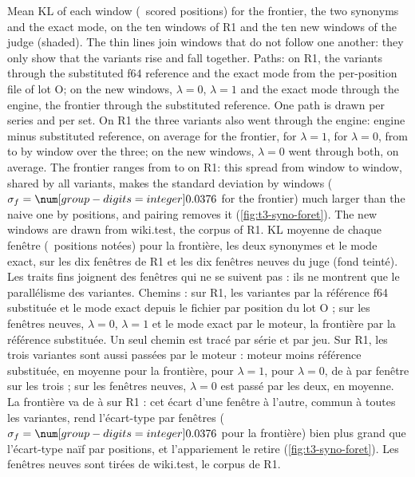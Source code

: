   {Mean KL of each window (\JconsNNotees\ scored positions) for the frontier, the two synonyms and the exact mode,
   on the ten windows of R1 and the ten new windows of the judge (shaded). The thin lines join windows that do not
   follow one another: they only show that the variants rise and fall together. Paths: on R1, the variants
   through the substituted f64 reference and the exact mode from the per-position file of lot O; on the new
   windows, $\lambda=0$, $\lambda=1$ and the exact mode through the engine, the frontier through the substituted
   reference. One path is drawn per series and per set. On R1 the three variants also went through the engine:
   engine minus substituted reference, \CodonNum{\JconsNCheminRunMoy} on average for the frontier,
   \CodonNum{+\JconsNCheminRunMoyUn} for $\lambda=1$, \CodonNum{\JconsNCheminRunMoyZero} for $\lambda=0$, from
   \CodonNum{\JconsNCheminRunMin} to \CodonNum{+\JconsNCheminRunMax} by window over the three; on the new windows,
   $\lambda=0$ went through both, \CodonNum{\JconsNCheminNeufMoy} on average. The
   frontier ranges from \CodonNum{\JconsNFrontMin} to \CodonNum{\JconsNFrontMax} on R1: this spread from window to
   window, shared by all variants, makes the standard deviation by windows ($\sigma_f=\CodonNum{\JconsNSigmaF}$ for
   the frontier) much larger than the naive one by positions, and pairing removes it (\cref{fig:t3-syno-foret}).
   The new windows are drawn from wiki.test, the corpus of R1.}
  {KL moyenne de chaque fenêtre (\JconsNNotees\ positions notées) pour la frontière, les deux synonymes et le mode
   exact, sur les dix fenêtres de R1 et les dix fenêtres neuves du juge (fond teinté). Les traits fins joignent des
   fenêtres qui ne se suivent pas : ils ne montrent que le parallélisme des variantes. Chemins : sur R1, les
   variantes par la référence f64 substituée et le mode exact depuis le fichier par position du lot O ; sur les
   fenêtres neuves, $\lambda=0$, $\lambda=1$ et le mode exact par le moteur, la frontière par la référence
   substituée. Un seul chemin est tracé par série et par jeu. Sur R1, les trois variantes sont aussi passées par
   le moteur : moteur moins référence substituée, \CodonNum{\JconsNCheminRunMoy} en moyenne pour la frontière,
   \CodonNum{+\JconsNCheminRunMoyUn} pour $\lambda=1$, \CodonNum{\JconsNCheminRunMoyZero} pour $\lambda=0$, de
   \CodonNum{\JconsNCheminRunMin} à \CodonNum{+\JconsNCheminRunMax} par fenêtre sur les trois ; sur les fenêtres
   neuves, $\lambda=0$ est passé par les deux, \CodonNum{\JconsNCheminNeufMoy} en moyenne. La frontière va de \CodonNum{\JconsNFrontMin} à \CodonNum{\JconsNFrontMax} sur R1 : cet écart
   d'une fenêtre à l'autre, commun à toutes les variantes, rend l'écart-type par fenêtres
   ($\sigma_f=\CodonNum{\JconsNSigmaF}$ pour la frontière) bien plus grand que l'écart-type naïf par positions, et
   l'appariement le retire (\cref{fig:t3-syno-foret}). Les fenêtres neuves sont tirées de wiki.test, le corpus de R1.}
\fi
